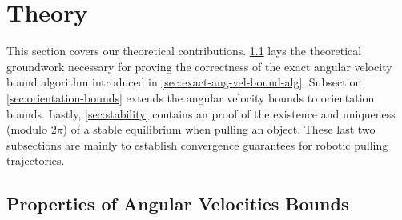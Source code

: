 \documentclass[conference]{IEEEtran}
\newtheorem{proposition}{Proposition}
\newcommand{\EH}[1]{{\color{blue} {Eric: {#1}}  }}
\begin{document}
\section{Theory}\label{sec:theory}

This section covers our theoretical
contributions. \ref{sec:prop-angular-velocity-bounds} lays the
theoretical groundwork necessary for proving the correctness of the
exact angular velocity bound algorithm introduced in
\ref{sec:exact-ang-vel-bound-alg}. Subsection
\ref{sec:orientation-bounds} extends the angular velocity bounds to
orientation bounds. Lastly, \ref{sec:stability} contains an proof of
the existence and uniqueness (modulo $2\pi$) of a stable equilibrium
when pulling an object. These last two subsections are mainly to
establish convergence guarantees for robotic pulling trajectories.

\subsection{Properties of Angular Velocities Bounds}\label{sec:prop-angular-velocity-bounds}


\end{document}
